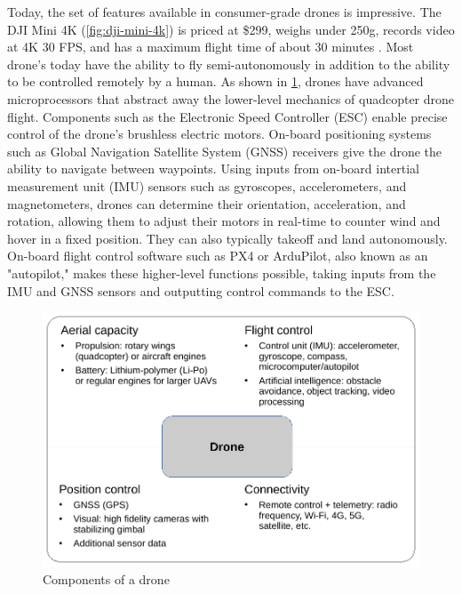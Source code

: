 Today, the set of features available in consumer-grade drones is impressive.
The DJI Mini 4K (\cref{fig:dji-mini-4k}) is priced at \$299, weighs under 250g,
records video at 4K 30 FPS, and has a maximum flight time of about 30 minutes
\cite{dji_mini_4k}. Most drone's today have the ability to fly
semi-autonomously in addition to the ability to be controlled remotely by a
human. As shown in \cref{fig:drone-components}, drones have advanced
microprocessors that abstract away the lower-level mechanics of quadcopter
drone flight. Components such as the Electronic Speed Controller (ESC) enable
precise control of the drone's brushless electric motors. On-board positioning
systems such as Global Navigation Satellite System (GNSS) receivers give the
drone the ability to navigate between waypoints.  Using inputs from on-board
intertial measurement unit (IMU) sensors such as gyroscopes, accelerometers,
and magnetometers, drones can determine their orientation, acceleration, and
rotation, allowing them to adjust their motors in real-time to counter wind and
hover in a fixed position. They can also typically takeoff and land
autonomously. On-board flight control software such as PX4 or ArduPilot, also
known as an "autopilot," makes these higher-level functions possible, taking
inputs from the IMU and GNSS sensors and outputting control commands to the
ESC.

\begin{figure}[htbp]
\centerline{\includegraphics[width = .6\textwidth]{figs/drone-components-crop.pdf}}
\caption{Components of a drone \cite{giones2017}}
\label{fig:drone-components}
\end{figure}

